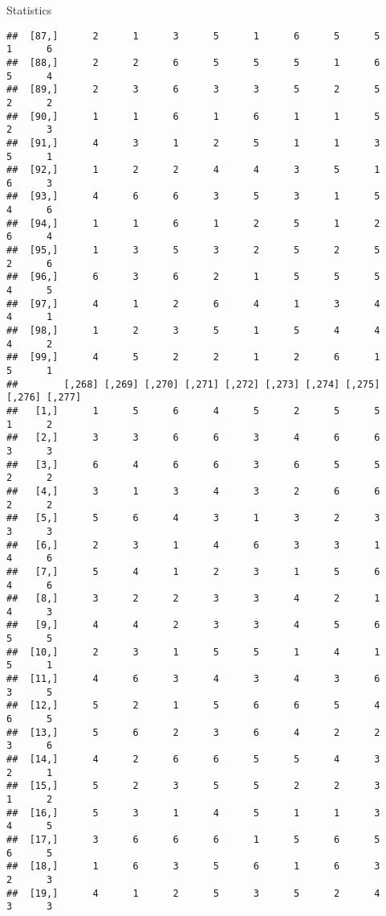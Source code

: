 \documentclass[
  ignorenonframetext,
]{beamer}
\begin{document}
\begin{frame}[fragile]{Statistics}
\begin{verbatim}
##  [87,]      2      1      3      5      1      6      5      5      1      6
##  [88,]      2      2      6      5      5      5      1      6      5      4
##  [89,]      2      3      6      3      3      5      2      5      2      2
##  [90,]      1      1      6      1      6      1      1      5      2      3
##  [91,]      4      3      1      2      5      1      1      3      5      1
##  [92,]      1      2      2      4      4      3      5      1      6      3
##  [93,]      4      6      6      3      5      3      1      5      4      6
##  [94,]      1      1      6      1      2      5      1      2      6      4
##  [95,]      1      3      5      3      2      5      2      5      2      6
##  [96,]      6      3      6      2      1      5      5      5      4      5
##  [97,]      4      1      2      6      4      1      3      4      4      1
##  [98,]      1      2      3      5      1      5      4      4      4      2
##  [99,]      4      5      2      2      1      2      6      1      5      1
##        [,268] [,269] [,270] [,271] [,272] [,273] [,274] [,275] [,276] [,277]
##   [1,]      1      5      6      4      5      2      5      5      1      2
##   [2,]      3      3      6      6      3      4      6      6      3      3
##   [3,]      6      4      6      6      3      6      5      5      2      2
##   [4,]      3      1      3      4      3      2      6      6      2      2
##   [5,]      5      6      4      3      1      3      2      3      3      3
##   [6,]      2      3      1      4      6      3      3      1      4      6
##   [7,]      5      4      1      2      3      1      5      6      4      6
##   [8,]      3      2      2      3      3      4      2      1      4      3
##   [9,]      4      4      2      3      3      4      5      6      5      5
##  [10,]      2      3      1      5      5      1      4      1      5      1
##  [11,]      4      6      3      4      3      4      3      6      3      5
##  [12,]      5      2      1      5      6      6      5      4      6      5
##  [13,]      5      6      2      3      6      4      2      2      3      6
##  [14,]      4      2      6      6      5      5      4      3      2      1
##  [15,]      5      2      3      5      5      2      2      3      1      2
##  [16,]      5      3      1      4      5      1      1      3      4      5
##  [17,]      3      6      6      6      1      5      6      5      6      5
##  [18,]      1      6      3      5      6      1      6      3      2      3
##  [19,]      4      1      2      5      3      5      2      4      3      3

\end{verbatim}
\end{frame}
\end{document}
